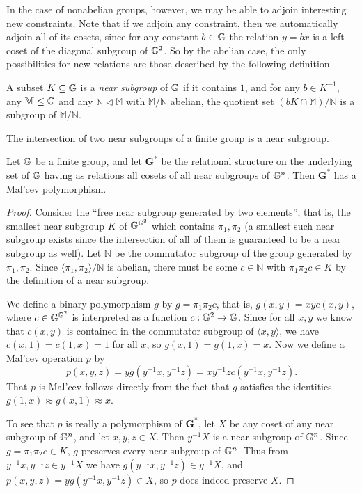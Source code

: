 \documentclass[letterpaper,11pt]{article}
\begin{document}
In the case of nonabelian groups, however, we may be able to adjoin interesting new constraints. Note that if we adjoin any constraint, then we automatically adjoin all of its cosets, since for any constant $b \in \mathbb{G}$ the relation $y = bx$ is a left coset of the diagonal subgroup of $\mathbb{G}^2$. So by the abelian case, the only possibilities for new relations are those described by the following definition.

\begin{defn} A subset $K \subseteq \mathbb{G}$ is a \emph{near subgroup} of $\mathbb{G}$ if it contains $1$, and for any $b \in K^{-1}$, any $\mathbb{M} \le \mathbb{G}$ and any $\mathbb{N} \lhd \mathbb{M}$ with $\mathbb{M}/\mathbb{N}$ abelian, the quotient set $(bK\cap \mathbb{M})/\mathbb{N}$ is a subgroup of $\mathbb{M}/\mathbb{N}$.
\end{defn}

\begin{thm}\label{near-subgroups} The intersection of two near subgroups of a finite group is a near subgroup.
\end{thm}

\begin{cor} Let $\mathbb{G}$ be a finite group, and let $\mathbf{G}^*$ be the relational structure on the underlying set of $\mathbb{G}$ having as relations all cosets of all near subgroups of $\mathbb{G}^n$. Then $\mathbf{G}^*$ has a Mal'cev polymorphism.
\end{cor}
\begin{proof} Consider the ``free near subgroup generated by two elements'', that is, the smallest near subgroup $K$ of $\mathbb{G}^{\mathbb{G}^2}$ which contains $\pi_1, \pi_2$ (a smallest such near subgroup exists since the intersection of all of them is guaranteed to be a near subgroup as well). Let $\mathbb{N}$ be the commutator subgroup of the group generated by $\pi_1, \pi_2$. Since $\langle \pi_1,\pi_2\rangle / \mathbb{N}$ is abelian, there must be some $c \in \mathbb{N}$ with $\pi_1\pi_2c \in K$ by the definition of a near subgroup.

We define a binary polymorphism $g$ by $g = \pi_1\pi_2c$, that is, $g(x,y) = xyc(x,y)$, where $c \in \mathbb{G}^{\mathbb{G}^2}$ is interpreted as a function $c : \mathbb{G}^2 \rightarrow \mathbb{G}$. Since for all $x,y$ we know that $c(x,y)$ is contained in the commutator subgroup of $\langle x, y\rangle$, we have $c(x,1) = c(1,x) = 1$ for all $x$, so $g(x,1) = g(1,x) = x$. Now we define a Mal'cev operation $p$ by
\[
p(x,y,z) = yg(y^{-1}x,y^{-1}z) = xy^{-1}zc(y^{-1}x,y^{-1}z).
\]
That $p$ is Mal'cev follows directly from the fact that $g$ satisfies the identities $g(1,x) \approx g(x,1) \approx x$.

To see that $p$ is really a polymorphism of $\mathbf{G}^*$, let $X$ be any coset of any near subgroup of $\mathbb{G}^n$, and let $x,y,z \in X$. Then $y^{-1}X$ is a near subgroup of $\mathbb{G}^n$. Since $g = \pi_1\pi_2c \in K$, $g$ preserves every near subgroup of $\mathbb{G}^n$. Thus from $y^{-1}x, y^{-1}z \in y^{-1}X$ we have $g(y^{-1}x,y^{-1}z) \in y^{-1}X$, and $p(x,y,z) = yg(y^{-1}x,y^{-1}z) \in X$, so $p$ does indeed preserve $X$.
\end{proof}
\end{document}
